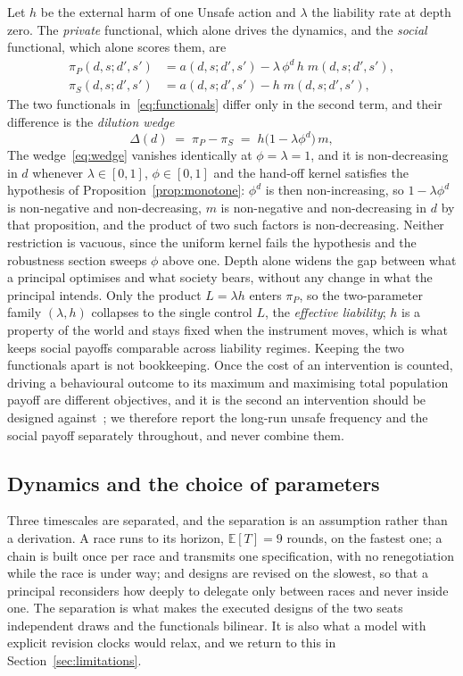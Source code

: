 \documentclass[11pt,a4paper]{article}
\theoremstyle{definition}
\newcommand{\piP}{\pi_{P}}
\newcommand{\piS}{\pi_{S}}
\begin{document}
Let $h$ be the external harm of one Unsafe action and $\lambda$ the liability
rate at depth zero. The \emph{private} functional, which alone drives the
dynamics, and the \emph{social} functional, which alone scores them, are
\begin{align}
  \piP(d,s;d',s') &= a(d,s;d',s') - \lambda\,\phi^{d}\,h\; m(d,s;d',s'), \\
  \piS(d,s;d',s') &= a(d,s;d',s') - h\; m(d,s;d',s') ,
  \label{eq:functionals}
\end{align}
The two functionals in~\eqref{eq:functionals} differ only in the second term,
and their difference is the \emph{dilution wedge}
\begin{equation}
  \Delta(d) \;=\; \piP - \piS \;=\; h\bigl(1-\lambda\phi^{d}\bigr)\, m ,
  \label{eq:wedge}
\end{equation}
The wedge~\eqref{eq:wedge} vanishes identically at $\phi=\lambda=1$, and it is
non-decreasing in $d$ whenever $\lambda\in[0,1]$, $\phi\in[0,1]$ and the
hand-off kernel satisfies the hypothesis of Proposition~\ref{prop:monotone}:
$\phi^{d}$ is then non-increasing, so $1-\lambda\phi^{d}$ is non-negative and
non-decreasing, $m$ is non-negative and non-decreasing in $d$ by that
proposition, and the product of two such factors is non-decreasing. Neither
restriction is vacuous, since the uniform kernel fails the hypothesis and the
robustness section sweeps $\phi$ above one.
Depth alone widens the gap between what a principal
optimises and what society bears, without any change in what the principal
intends. Only the product $L=\lambda h$ enters $\piP$, so the two-parameter
family $(\lambda,h)$ collapses to the single control $L$, the \emph{effective
liability}; $h$ is a property of the world and stays fixed when the instrument
moves, which is what keeps social payoffs comparable across liability regimes.
Keeping the two functionals apart is not bookkeeping. Once the cost of an
intervention is counted, driving a behavioural outcome to its maximum and
maximising total population payoff are different objectives, and it is the
second an intervention should be designed against~\citep{han2026welfare}; we
therefore report the long-run unsafe frequency and the social payoff
separately throughout, and never combine them.

\subsection{Dynamics and the choice of parameters}

Three timescales are separated, and the separation is an assumption rather than
a derivation. A race runs to its horizon, $\mathbb{E}[T]=9$ rounds, on the
fastest one; a chain is built once per race and transmits one specification,
with no renegotiation while the race is under way; and designs are revised on
the slowest, so that a principal reconsiders how deeply to delegate only
between races and never inside one. The separation is what makes the executed
designs of the two seats independent draws and the functionals bilinear. It is
also what a model with explicit revision clocks would relax, and we return to
this in Section~\ref{sec:limitations}.
\end{document}
